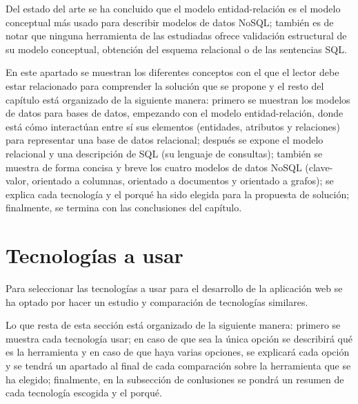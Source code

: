 
Del estado del arte se ha concluido que el modelo entidad-relación es el modelo conceptual más usado para describir modelos de datos NoSQL; también es de notar que ninguna herramienta de las estudiadas ofrece validación estructural de su modelo conceptual, obtención del esquema relacional o de las sentencias SQL.


En este apartado se muestran los diferentes conceptos con el que el lector debe estar relacionado para comprender la solución que se propone y el resto del capítulo está organizado de la siguiente manera: primero se muestran los modelos de datos para bases de datos, empezando con el modelo entidad-relación, donde está cómo interactúan entre sí sus elementos (entidades, atributos y relaciones) para representar una base de datos relacional; después se expone el modelo relacional y una descripción de SQL (su lenguaje de consultas); también se muestra de forma concisa y breve los cuatro modelos de datos NoSQL (clave-valor, orientado a columnas, orientado a documentos y orientado a grafos); se explica cada tecnología y el porqué ha sido elegida para la propuesta de solución; finalmente, se termina con las conclusiones del capítulo.



 

 






\section{Tecnologías a usar}
Para seleccionar las tecnologías a usar para el desarrollo de la aplicación web se ha optado por hacer un estudio y comparación de tecnologías similares.


Lo que resta de esta sección está organizado de la siguiente manera: primero se muestra cada tecnología usar; en caso de que sea la única opción se describirá qué es la herramienta y en caso de que haya varias opciones, se explicará cada opción y se tendrá un apartado al final de cada comparación sobre la herramienta que se ha elegido; finalmente, en la subsección de conlusiones se pondrá un resumen de cada tecnología escogida y el porqué.










